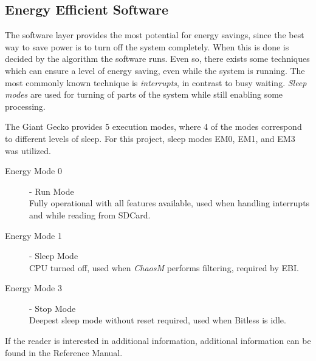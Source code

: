 \subsection{Energy Efficient Software}

The software layer provides the most potential for energy savings, since the
best way to save power is to turn off the system completely. When this is done
is decided by the algorithm the software runs. Even so, there exists some
techniques which can ensure a level of energy saving, even while the system is
running. The most commonly known technique is \textit{interrupts}, in contrast
to busy waiting. {\it Sleep modes} are used for turning of parts of the system
while still enabling some processing.

The Giant Gecko provides 5 execution modes, where 4 of the modes correspond to different levels
of sleep. For this project, sleep modes EM0, EM1, and EM3 was utilized.


\begin{description}
	\item[Energy Mode 0] - Run Mode \hfill \\
		Fully operational with all features available, used when handling
interrupts and while reading from SDCard.
	\item[Energy Mode 1] - Sleep Mode \hfill \\
		CPU turned off, used when \textit{ChaosM} performs filtering, required
by EBI.
	\item[Energy Mode 3] - Stop Mode \hfill \\
		Deepest sleep mode without reset required, used when Bitless is idle.
\end{description}

If the reader is interested in additional information, additional information
can be found in the Reference Manual\cite{efm32gg}.
